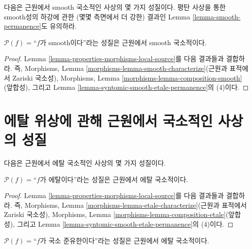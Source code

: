 \noindent
다음은 근원에서 smooth 국소적인 사상의 몇 가지 성질이다.
평탄 사상을 통한 smooth성의 하강에 관한 (몇몇 측면에서 더 강한)
결과인 Lemma \ref{lemma-smooth-permanence}도 유의하라.

\begin{lemma}
\label{lemma-smooth-smooth-local-source}
$\mathcal{P}(f)=$``$f$가 smooth이다''라는 성질은
근원에서 smooth 국소적이다.
\end{lemma}

\begin{proof}
Lemma \ref{lemma-properties-morphisms-local-source}를 다음 결과들과
결합하라. 즉, Morphisms, Lemma
\ref{morphisms-lemma-smooth-characterize}(근원과 표적에서 Zariski
국소성), Morphisms, Lemma
\ref{morphisms-lemma-composition-smooth}(앞합성), 그리고 Lemma
\ref{lemma-syntomic-smooth-etale-permanence}의 (4)이다.
\end{proof}



\section{에탈 위상에 관해 근원에서 국소적인 사상의 성질}
\label{section-etale-local-source}

\noindent
다음은 근원에서 에탈 국소적인 사상의 몇 가지 성질이다.

\begin{lemma}
\label{lemma-etale-etale-local-source}
$\mathcal{P}(f)=$``$f$가 에탈이다''라는 성질은
근원에서 에탈 국소적이다.
\end{lemma}

\begin{proof}
Lemma \ref{lemma-properties-morphisms-local-source}를 다음 결과들과
결합하라. 즉, Morphisms, Lemma
\ref{morphisms-lemma-etale-characterize}(근원과 표적에서 Zariski
국소성), Morphisms, Lemma
\ref{morphisms-lemma-composition-etale}(앞합성), 그리고 Lemma
\ref{lemma-syntomic-smooth-etale-permanence}의 (4)이다.
\end{proof}

\begin{lemma}
\label{lemma-locally-quasi-finite-etale-local-source}
$\mathcal{P}(f)=$``$f$가 국소 준유한이다''라는 성질은
근원에서 에탈 국소적이다.
\end{lemma}

